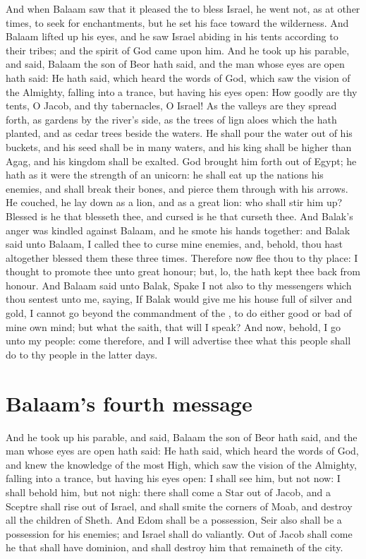 \begin{biblechapter} %
\verse And when Balaam saw that it pleased the \LORD to bless Israel, he went not, as at other times, to seek for enchantments, but he set his face toward the wilderness.
\verse And Balaam lifted up his eyes, and he saw Israel abiding in his tents according to their tribes; and the spirit of God came upon him.
\verse And he took up his parable, and said, Balaam the son of Beor hath said, and the man whose eyes are open hath said:
\verse He hath said, which heard the words of God, which saw the vision of the Almighty, falling into a trance, but having his eyes open:
\verse How goodly are thy tents, O Jacob, and thy tabernacles, O Israel!
\verse As the valleys are they spread forth, as gardens by the river's side, as the trees of lign aloes which the \LORD hath planted, and as cedar trees beside the waters.
\verse He shall pour the water out of his buckets, and his seed shall be in many waters, and his king shall be higher than Agag, and his kingdom shall be exalted.
\verse God brought him forth out of Egypt; he hath as it were the strength of an unicorn: he shall eat up the nations his enemies, and shall break their bones, and pierce them through with his arrows.
\verse He couched, he lay down as a lion, and as a great lion: who shall stir him up? Blessed is he that blesseth thee, and cursed is he that curseth thee.
\verse And Balak's anger was kindled against Balaam, and he smote his hands together: and Balak said unto Balaam, I called thee to curse mine enemies, and, behold, thou hast altogether blessed them these three times.
\verse Therefore now flee thou to thy place: I thought to promote thee unto great honour; but, lo, the \LORD hath kept thee back from honour.
\verse And Balaam said unto Balak, Spake I not also to thy messengers which thou sentest unto me, saying,
\verse If Balak would give me his house full of silver and gold, I cannot go beyond the commandment of the \LORD, to do either good or bad of mine own mind; but what the \LORD saith, that will I speak?
\verse And now, behold, I go unto my people: come therefore, and I will advertise thee what this people shall do to thy people in the latter days.
\section*{Balaam's fourth message}
\verse And he took up his parable, and said, Balaam the son of Beor hath said, and the man whose eyes are open hath said:
\verse He hath said, which heard the words of God, and knew the knowledge of the most High, which saw the vision of the Almighty, falling into a trance, but having his eyes open:
\verse I shall see him, but not now: I shall behold him, but not nigh: there shall come a Star out of Jacob, and a Sceptre shall rise out of Israel, and shall smite the corners of Moab, and destroy all the children of Sheth.
\verse And Edom shall be a possession, Seir also shall be a possession for his enemies; and Israel shall do valiantly.
\verse Out of Jacob shall come he that shall have dominion, and shall destroy him that remaineth of the city.

\end{biblechapter}
